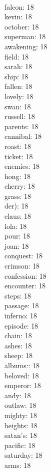\begin{multicols}{6}
  \\ falcon: 18
  \\ kevin: 18
  \\ october: 18
  \\ superman: 18
  \\ awakening: 18
  \\ field: 18
  \\ sarah: 18
  \\ ship: 18
  \\ fallen: 18
  \\ lovely: 18
  \\ swan: 18
  \\ russell: 18
  \\ parents: 18
  \\ cannibal: 18
  \\ roast: 18
  \\ ticket: 18
  \\ enemies: 18
  \\ hong: 18
  \\ cherry: 18
  \\ grass: 18
  \\ der): 18
  \\ claus: 18
  \\ lola: 18
  \\ pour: 18
  \\ joan: 18
  \\ conquest: 18
  \\ crimson: 18
  \\ confession: 18
  \\ encounter: 18
  \\ steps: 18
  \\ passage: 18
  \\ inferno: 18
  \\ episode: 18
  \\ chain: 18
  \\ ashes: 18
  \\ sheep: 18
  \\ albums:: 18
  \\ beloved: 18
  \\ emperor: 18
  \\ andy: 18
  \\ outlaw: 18
  \\ mighty: 18
  \\ heights: 18
  \\ satan's: 18
  \\ pacific: 18
  \\ saturday: 18
  \\ arms: 18

\end{multicols}
